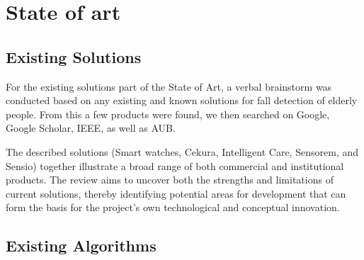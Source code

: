 \section{State of art}



\subsection{Existing Solutions}

For the existing solutions part of the State of Art, a verbal brainstorm was conducted based on any existing and known solutions for fall detection of elderly people. From this a few products were found, we then searched on Google, Google Scholar, IEEE, as well as AUB.

The described solutions (Smart watches, Cekura, Intelligent Care, Sensorem, and Sensio) together illustrate a broad range of both commercial and institutional products. The review aims to uncover both the strengths and limitations of current solutions, thereby identifying potential areas for development that can form the basis for the project’s own technological and conceptual innovation.








\subsection{Existing Algorithms}




